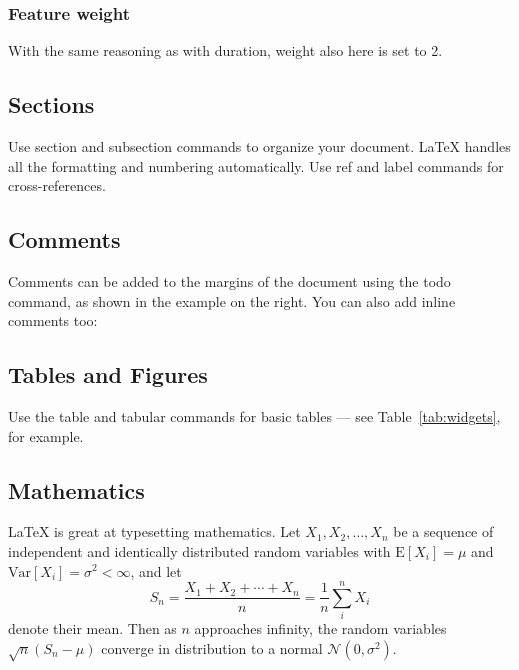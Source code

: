 \documentclass[12pt]{article}
\begin{document}
\subsubsection{Feature weight}

With the same reasoning as with duration, weight also here is set to 2. 

\subsection{Sections}

Use section and subsection commands to organize your document. \LaTeX{} handles all the formatting and numbering automatically. Use ref and label commands for cross-references.

\subsection{Comments}

Comments can be added to the margins of the document using the  todo command, as shown in the example on the right. You can also add inline comments too:


\subsection{Tables and Figures}

Use the table and tabular commands for basic tables --- see Table~\ref{tab:widgets}, for example. 


\subsection{Mathematics}

\LaTeX{} is great at typesetting mathematics. Let $X_1, X_2, \ldots, X_n$ be a sequence of independent and identically distributed random variables with $\text{E}[X_i] = \mu$ and $\text{Var}[X_i] = \sigma^2 < \infty$, and let
$$S_n = \frac{X_1 + X_2 + \cdots + X_n}{n}
      = \frac{1}{n}\sum_{i}^{n} X_i$$
denote their mean. Then as $n$ approaches infinity, the random variables $\sqrt{n}(S_n - \mu)$ converge in distribution to a normal $\mathcal{N}(0, \sigma^2)$.
\end{document}
